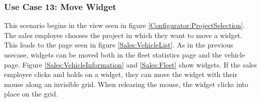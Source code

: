 \subsubsection{Use Case 13: Move Widget}
This scenario begins in the view seen in figure \ref{Configurator:ProjectSelection}. The sales employee chooses the project in which they want to move a widget. This leads to the page seen in figure \ref{Sales:VehicleList}. As in the previous \gls{usecase}, \glspl{widget} can be moved both in the fleet statistics page and the vehicle page. Figure \ref{Sales:VehicleInformation} and \ref{Sales:Fleet} show \glspl{widget}. If the sales employee clicks and holds on a widget, they can move the \gls{widget} with their mouse along an invisible grid. When releasing the mouse, the \gls{widget} clicks into place on the grid.